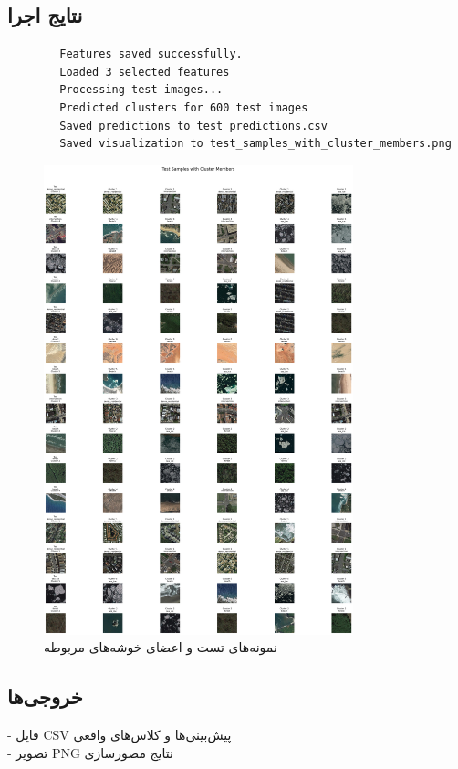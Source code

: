 \documentclass[a4paper,12pt]{article}
\begin{document}
	\subsection*{\textbf{نتایج اجرا}}
	\begin{latin}
		\begin{verbatim}
		Features saved successfully.
		Loaded 3 selected features
		Processing test images...
		Predicted clusters for 600 test images
		Saved predictions to test_predictions.csv
		Saved visualization to test_samples_with_cluster_members.png
		\end{verbatim}
	\end{latin}
		\begin{figure}[h]
		\centering
		\includegraphics[width=0.8\textwidth]{test_samples_with_cluster_members.png}
		\caption{نمونه‌های تست و اعضای خوشه‌های مربوطه}
	\end{figure}
	
	\subsection*{\textbf{خروجی‌ها}}
	- فایل CSV پیش‌بینی‌ها و کلاس‌های واقعی
	\\
	- تصویر PNG نتایج مصورسازی
\end{document}
